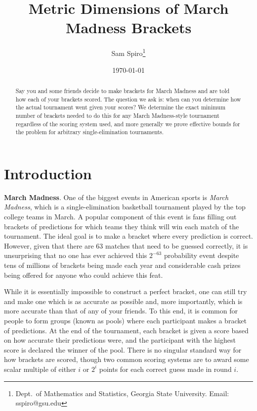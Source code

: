 \documentclass[12pt,letterpaper]{article}
\title{Metric Dimensions of March Madness Brackets}
\author{Sam Spiro\footnote{Dept.\ of Mathematics and Statistics, Georgia State University.  Email: sspiro@gsu.edu}}
\date{\today}
\theoremstyle{definition}
\renewcommand{\1}{\mathbbm{1}}
\begin{document}
\maketitle

\vspace{-3em}

\begin{abstract}
	Say you and some friends decide to make brackets for March Madness and are told how each of your brackets scored.  The question we ask is: when can you determine how the actual tournament went given your scores?  We determine the exact minimum number of brackets needed to do this for any March Madness-style tournament regardless of the scoring system used, and more generally we prove effective bounds for the problem for arbitrary single-elimination tournaments.
\end{abstract}

\section{Introduction}

\textbf{March Madness}. One of the biggest events in American sports is \textit{March Madness}, which is a single-elimination basketball tournament played by the top college teams in March.  A popular component of this event is fans filling out brackets of predictions for which teams they think will win each match of the tournament.  The ideal goal is to make a bracket where every prediction is correct.  However, given that there are 63 matches that need to be guessed correctly, it is unsurprising that no one has ever achieved this $2^{-63}$ probability event despite tens of millions of brackets being made each year and considerable cash prizes being offered for anyone who could achieve this feat.

While it is essentially impossible to construct a perfect bracket, one can still try and make one which is as accurate as possible and, more importantly, which is more accurate than that of any of your friends.  To this end, it is common for people to form groups (known as pools) where each participant makes a bracket of predictions.  At the end of the tournament, each bracket is given a score based on how accurate their predictions were, and the participant with the highest score is declared the winner of the pool. There is no singular standard way for how brackets are scored, though two common scoring systems are to award some scalar multiple of either $i$ or $2^{i}$ points for each correct guess made in round $i$.
\end{document}
